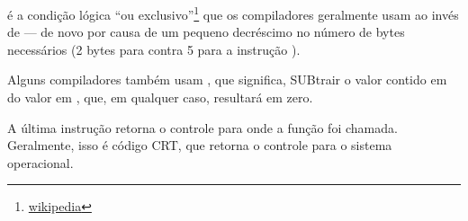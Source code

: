 \XOR é a condição lógica ``ou exclusivo''\footnote{\href{http://en.wikipedia.org/wiki/Exclusive_or}{wikipedia}} que os compiladores geralmente usam ao invés de 
 --- de novo por causa de um pequeno decréscimo no número de bytes necessários (2 bytes para \XOR contra 5 para a instrução \MOV).

Alguns compiladores também usam , que significa, SUBtrair o valor contido em \EAX do valor em \EAX, que, em qualquer caso, resultará em zero.

A última instrução \RET retorna o controle para onde a função foi chamada. Geralmente, isso é código \CCpp \ac{CRT}, que retorna o controle para o sistema operacional.

